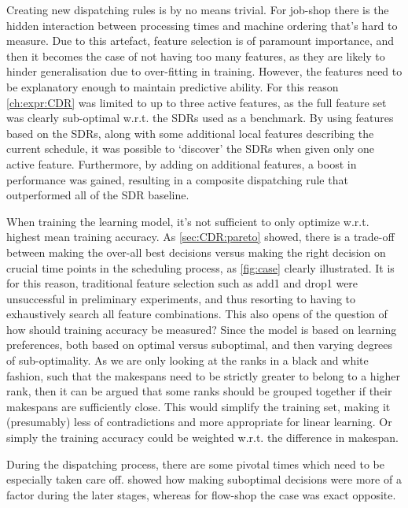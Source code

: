 \documentclass[smallextended]{svjour3}
\begin{document}
	Creating new dispatching rules is by no means trivial. For job-shop there is the hidden interaction between processing times and machine ordering that's hard to measure.
	Due to this artefact, feature selection is of paramount importance, and then it becomes the case of not having too many features, as they are likely to hinder generalisation due to over-fitting in training. 
	However, the features need to be explanatory enough to maintain predictive ability. 
	For this reason \cref{ch:expr:CDR} was limited to up to three active features, as the full feature set was clearly sub-optimal w.r.t. the SDRs used as a benchmark. 
	By using features based on the SDRs, along with some additional local features describing the current schedule, it was possible to `discover' the SDRs when given only one active feature. %
	Furthermore, by adding on additional features, a boost in performance was gained, resulting in a composite dispatching rule that outperformed all of the SDR baseline. 
	
	When training the learning model, it's not sufficient to only optimize w.r.t. highest mean training accuracy. As \cref{sec:CDR:pareto} showed, there is a trade-off between making the over-all best decisions versus making the right decision on crucial time points in the scheduling process, as \cref{fig:case} clearly illustrated. It is for this reason, traditional feature selection such as add1 and drop1 were unsuccessful in preliminary experiments, and thus resorting to having to exhaustively search all feature combinations.
	This also opens of the question of how should training accuracy be measured? Since the model is based on learning preferences, both based on optimal versus suboptimal, and then varying degrees of sub-optimality. As we are only looking at the ranks in a black and white fashion, such that the makespans need to be strictly greater to belong to a higher rank, then it can be argued that some ranks should be grouped together if their makespans are sufficiently close. This would simplify the training set, making it (presumably) less of contradictions and more appropriate for linear learning. Or simply the training accuracy could be weighted w.r.t. the  difference in makespan.
	
	During the dispatching process, there are some pivotal times which need to be especially taken care off.  showed how making suboptimal decisions were more of a factor during the later stages, whereas for flow-shop the case was exact opposite. 
	
\end{document}
